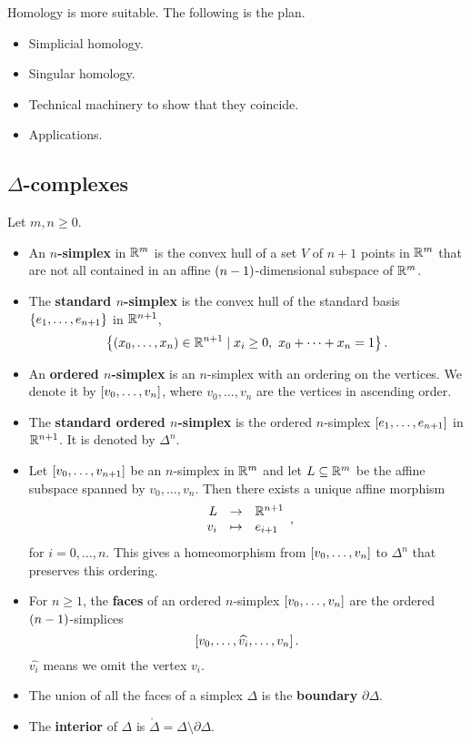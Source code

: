 Homology is more suitable. The following is the plan.
\begin{itemize}
\item Simplicial homology.
\item Singular homology.
\item Technical machinery to show that they coincide.
\item Applications.
\end{itemize}

\pagebreak

\subsection{$ \Delta $-complexes}

\begin{definition*}
Let $ m, n \ge 0 $.
\begin{itemize}
\item An \textbf{$ n $-simplex} in $ \R^m $ is the convex hull of a set $ V $ of $ n + 1 $ points in $ \R^m $ that are not all contained in an affine $ \rb{n - 1} $-dimensional subspace of $ \R^m $.
\item The \textbf{standard $ n $-simplex} is the convex hull of the standard basis $ \cb{e_1, \dots, e_{n + 1}} $ in $ \R^{n + 1} $,
$$ \cb{\rb{x_0, \dots, x_n} \in \R^{n + 1} \mid x_i \ge 0, \ x_0 + \dots + x_n = 1}. $$
\item An \textbf{ordered $ n $-simplex} is an $ n $-simplex with an ordering on the vertices. We denote it by $ \sb{v_0, \dots, v_n} $, where $ v_0, \dots, v_n $ are the vertices in ascending order.
\item The \textbf{standard ordered $ n $-simplex} is the ordered $ n $-simplex $ \sb{e_1, \dots, e_{n + 1}} $ in $ \R^{n + 1} $. It is denoted by $ \Delta^n $.
\item Let $ \sb{v_0, \dots, v_{n + 1}} $ be an $ n $-simplex in $ \R^m $ and let $ L \subseteq \R^m $ be the affine subspace spanned by $ v_0, \dots, v_n $. Then there exists a unique affine morphism
$$ \function{L}{\R^{n + 1}}{v_i}{e_{i + 1}}, $$
for $ i = 0, \dots, n $. This gives a homeomorphism from $ \sb{v_0, \dots, v_n} $ to $ \Delta^n $ that preserves this ordering.
\item For $ n \ge 1 $, the \textbf{faces} of an ordered $ n $-simplex $ \sb{v_0, \dots, v_n} $ are the ordered $ \rb{n - 1} $-simplices
$$ \sb{v_0, \dots, \widehat{v_i}, \dots, v_n}. $$
$ \widehat{v_i} $ means we omit the vertex $ v_i $.
\item The union of all the faces of a simplex $ \Delta $ is the \textbf{boundary} $ \partial\Delta $.
\item The \textbf{interior} of $ \Delta $ is $ \mathring{\Delta} = \Delta \setminus \partial\Delta $.
\end{itemize}
\end{definition*}

